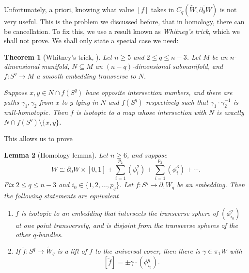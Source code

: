 \documentclass[a4paper, 12pt]{article}
\newtheorem{thm}{Theorem}[section]
\newtheorem{lemma}[thm]{Lemma}
\theoremstyle{definition}
\begin{document}
Unfortunately, a priori, knowing what value $[f]$ takes in $C_q(\tilde{W}, \widetilde{\partial_0 W})$ is not very useful. This is the problem we discussed before, that in homology, there can be cancellation. To fix this, we use a result known as \emph{Whitney's trick}, which we shall not prove. We shall only state a special case we need:

\begin{thm}[Whitney's trick, {\cite[Theorem 6.6]{milnor-h-cobordism}}]
  Let $n \geq 5$ and $2 \leq q \leq n - 3$. Let $M$ be an $n$-dimensional manifold, $N \subseteq M$ an $(n - q)$-dimensional submanifold, and $f: S^q \to M$ a smooth embedding transverse to $N$.

  Suppose $x, y \in N \cap f(S^q)$ have opposite intersection numbers, and there are paths $\gamma_1, \gamma_2$ from $x$ to $y$ lying in $N$ and $f(S^q)$ respectively such that $\gamma_1 \cdot \gamma_2^{-1}$ is null-homotopic. Then $f$ is isotopic to a map whose intersection with $N$ is exactly $N \cap f(S^q) \setminus \{x, y\}$.\qedhere
\end{thm}

This allows us to prove
\begin{lemma}[Homology lemma]
  Let $n \geq 6$, and suppose
  \[
    W \cong \partial_0 W \times [0, 1] + \sum_{i = 1}^{p_2} (\phi_i^2) + \sum_{i = 1}^{p_3} (\phi_i^3) + \cdots.
  \]
  Fix $2 \leq q \leq n - 3$ and $i_0 \in \{1, 2, \ldots, p_q\}$. Let $f: S^q \to \partial_1 W_q$ be an embedding. Then the following statements are equivalent
  \begin{enumerate}
    \item $f$ is isotopic to an embedding that intersects the transverse sphere of $(\phi_{i_0}^q)$ at one point transversely, and is disjoint from the transverse spheres of the other $q$-handles.
    \item If $\tilde{f}: S^q \to \tilde{W}_q$ is a lift of $f$ to the universal cover, then there is $\gamma \in \pi_1W$ with
      \[
        [\tilde{f}] = \pm \gamma \cdot (\phi_{i_0}^q).
      \]
  \end{enumerate}
\end{lemma}
\end{document}
